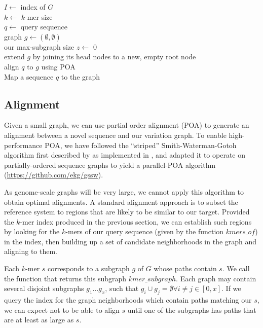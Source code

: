 \documentclass{article}
\begin{document}
\begin{algorithm}[h!]
  $I \gets $ index of $G$ \\
  $k \gets $ $k$-mer size \\
  $q \gets $ query sequence \\
  graph $g \gets ( \emptyset, \emptyset )$ \\
  our max-subgraph size $z \gets $ 0 \\
  extend $g$ by joining its head nodes to a new, empty root node \\
  align $q$ to $g$ using POA \\
  \caption{
    \label{alg:map}
    Map a sequence $q$ to the graph
  }
\end{algorithm}


\subsection{Alignment}

Given a small graph, we can use partial order alignment (POA) \cite{lee2002POA} to generate an alignment between a novel sequence and our variation graph. To enable high-performance POA, we have followed the ``striped'' Smith-Waterman-Gotoh algorithm first described by \cite{farrar2007striped} as implemented in \cite{zhao2013ssw}, and adapted it to operate on partially-ordered sequence graphs to yield a parallel-POA algorithm (\url{https://github.com/ekg/gssw}).

As genome-scale graphs will be very large, we cannot apply this algorithm to obtain optimal alignments. A standard alignment approach is to subset the reference system to regions that are likely to be similar to our target. Provided the $k$-mer index produced in the previous section, we can establish such regions by looking for the $k$-mers of our query sequence (given by the function $kmers\_of$) in the index, then building up a set of candidate neighborhoods in the graph and aligning to them.

Each $k$-mer $s$ corresponds to a subgraph $g$ of $G$ whose paths contain $s$. We call the function that returns this subgraph $kmer\_subgraph$. Each graph may contain several disjoint subgraphs $g_1\ldots g_x$, such that $g_i \cup g_j = \emptyset \forall i \ne j \in [0,x]$. If we query the index for the graph neighborhoods which contain paths matching our $s$, we can expect not to be able to align $s$ until one of the subgraphs has paths that are at least as large as $s$.
\end{document}
